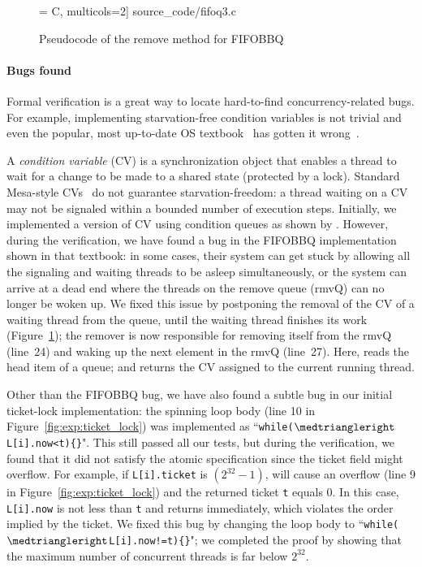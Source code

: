\begin{figure}[t]
 = C, multicols=2] {source_code/fifoq3.c}
\caption{Pseudocode of the remove method for FIFOBBQ}
\label{fig:exp:fifo}
\end{figure}

\paragraph{Bugs found}
Formal verification is a great way to
locate hard-to-find concurrency-related bugs.
For example,  implementing starvation-free condition variables
is not trivial and even the popular, most up-to-date OS
textbook~\cite[Figure~5.14]{ospp11} has gotten it
wrong~\cite{anderson16}.

A \emph{condition variable} (CV) is a synchronization object that
enables a thread to wait for a change to be made to a
shared state (protected by a lock).  Standard Mesa-style
CVs~\cite{lampson80} do not guarantee starvation-freedom: a thread
waiting on a CV may not be signaled within a bounded number of
execution steps. 
Initially, we implemented a version of CV
using condition queues as shown by \citet[Figure~5.14]{ospp11}. However, during the verification,
we have found a bug in the FIFOBBQ implementation shown in that
textbook: in some cases, their system can get stuck by allowing all
the signaling and waiting threads to be asleep simultaneously, or the
system can arrive at a dead end where the threads on the remove queue
(rmvQ) can no longer be woken up.  We fixed this issue by postponing
the removal of the CV of a waiting thread from the queue, until the
waiting thread finishes its work (\cf Figure~\ref{fig:exp:fifo}); the
remover is now responsible for removing itself from the rmvQ (line~24)
and waking up the next element in the rmvQ (line~27). Here, 
reads the head item of a queue; and  returns the CV
assigned to the current running thread. 

Other than the FIFOBBQ bug,
we have also found a subtle bug in  
our initial ticket-lock implementation:   
the spinning loop body (line 10 in Figure~\ref{fig:exp:ticket_lock})
was implemented as
``\lstinline$while($$\intp$\lstinline$L[i].now<t){}$". 
This still passed all our tests, but  
during the verification,
we found that it did not satisfy the atomic specification
since the ticket field might overflow. For example, 
if \lstinline$L[i].ticket$ is $(2^{32}-1)$,  will
cause an overflow (line 9 in  Figure~\ref{fig:exp:ticket_lock}) and
the returned ticket
\lstinline$t$ equals $0$. In this case, 
\lstinline$L[i].now$ is not less than \lstinline$t$ 
and  returns immediately, which violates 
the order implied by the ticket. We fixed this bug by 
changing the loop body to 
``\lstinline$while($$\intp$\lstinline$L[i].now!=t){}$";
we completed the proof by showing that the maximum 
number of concurrent threads is far below $2^{32}$.





